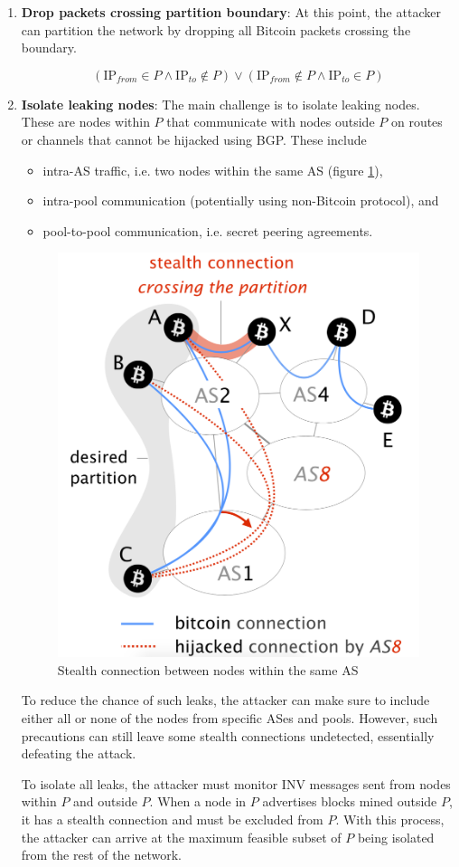 \documentclass[12pt]{article}
\begin{document}
\begin{enumerate}
    \item \textbf{Drop packets crossing partition boundary}: At this point, the attacker can partition the network by dropping all Bitcoin packets crossing the boundary.
    
    $$(\textrm{IP}_{from} \in P \land \textrm{IP}_{to} \not\in P) \lor (\textrm{IP}_{from} \not\in P \land \textrm{IP}_{to} \in P)$$

    \item \textbf{Isolate leaking nodes}: The main challenge is to isolate leaking nodes. These are nodes within $P$ that communicate with nodes outside $P$ on routes or channels that cannot be hijacked using BGP. These include
    
    \begin{itemize}
        \item intra-AS traffic, i.e. two nodes within the same AS (figure \ref{fig:stealth}),
        \item intra-pool communication (potentially using non-Bitcoin protocol), and
        \item pool-to-pool communication, i.e. secret peering agreements.
    \end{itemize}
    
\begin{figure}[h!]
\centering
\includegraphics[width=0.45\columnwidth]{images/stealth-connection.png}
\caption{Stealth connection between nodes within the same AS \cite{RoutingAttacks}}
\label{fig:stealth}
\end{figure}
    
    To reduce the chance of such leaks, the attacker can make sure to include either all or none of the nodes from specific ASes and pools. However, such precautions can still leave some stealth connections undetected, essentially defeating the attack.
    
To isolate all leaks, the attacker must monitor INV messages sent from nodes within $P$ and outside $P$.  When a node in $P$ advertises blocks mined outside $P$, it has a stealth connection and must be excluded from $P$. With this process, the attacker can arrive at the maximum feasible subset of $P$ being isolated from the rest of the network.
    
\end{enumerate}
\end{document}
